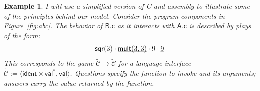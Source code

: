 \documentclass[11pt,oneside,draft]{book}
\newtheorem{example}[theorem]{Example}
\theoremstyle{definition}
\newcommand{\kw}[1]{\ensuremath{ \mathsf{#1} }}
\newcommand{\ul}[1]{%
  \underline{\smash{#1}}
}
\begin{document}
\begin{example} \label{ex:abc} %
I will use a simplified version of C and assembly
to illustrate some of the principles behind our model.
Consider the program components in Figure~\ref{fig:abc}.
The behavior of $\textsf{B.c}$
as it interacts with $\textsf{A.c}$
is described by plays of the form:
\begin{equation} \label{eqn:cplay}
  \mathsf{sqr}(3) \cdot
    \ul{\mathsf{mult}(3,3)} \cdot 9 \cdot \ul{9}
\end{equation}
This corresponds to the game
$\tilde{\mathcal{C}} \rightarrow \tilde{\mathcal{C}}$
for a language interface
$\tilde{\mathcal{C}} :=
 \langle \kw{ident} \times \kw{val}^*, \kw{val} \rangle$.
Questions specify the function to invoke
and its arguments;
answers carry the value returned by the function.


\end{example}
\end{document}
